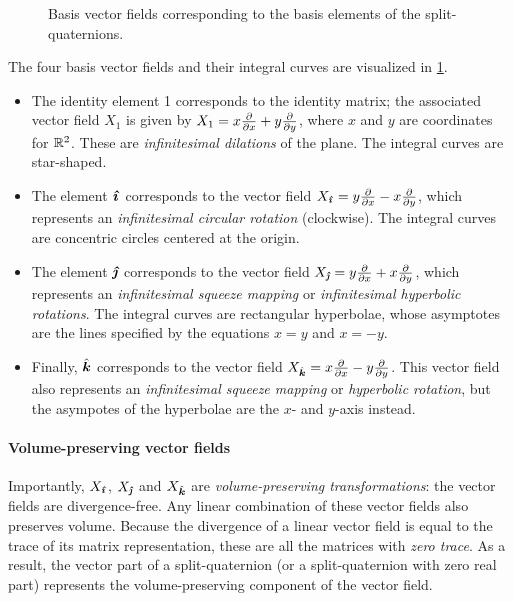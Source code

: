 \begin{figure}[ht!]
    \centering
    
    \caption{Basis vector fields corresponding to the basis elements of the split-quaternions.}
    \label{fig:basis_vf}
\end{figure}

The four basis vector fields and their integral curves are visualized in \cref{fig:basis_vf}.
\begin{itemize}
    \item The identity element 1 corresponds to the identity matrix; the associated vector field $X_1$ is given by $X_1 = x\pdv{}{x} + y\pdv{}{y}$, where $x$ and $y$ are coordinates for $\real^2$. These are \emph{infinitesimal dilations} of the plane. The integral curves are star-shaped.
    \item The element $\quati$ corresponds to the vector field $X_{\quati} = y\pdv{}{x} - x\pdv{}{y}$, which represents an \emph{infinitesimal circular rotation} (clockwise). The integral curves are concentric circles centered at the origin.
    \item The element $\quatj$ corresponds to the vector field $X_{\quatj} = y\pdv{x} + x\pdv{}{y}$, which represents an \emph{infinitesimal squeeze mapping} or \emph{infinitesimal hyperbolic rotations}. The integral curves are rectangular hyperbolae, whose asymptotes are the lines specified by the equations $x = y$ and $x = -y$.  
    \item Finally, $\quatk$ corresponds to the vector field $X_{\quatk} = x\pdv{x} - y\pdv{}{y}$. This vector field also represents an \emph{infinitesimal squeeze mapping} or \emph{hyperbolic rotation}, but the asympotes of the hyperbolae are the $x$- and $y$-axis instead.
\end{itemize}

\paragraph{Volume-preserving vector fields}
Importantly, $X_{\quati}$, $X_{\quatj}$ and $X_{\quatk}$ are \emph{volume-preserving transformations}: the vector fields are divergence-free. Any linear combination of these vector fields also preserves volume. Because the divergence of a linear vector field is equal to the trace of its matrix representation, these are all the matrices with \emph{zero trace}. As a result, the vector part of a split-quaternion (or a split-quaternion with zero real part) represents the volume-preserving component of the vector field. 

